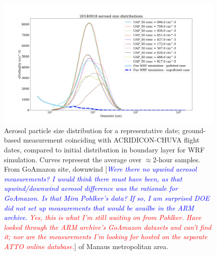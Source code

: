 \documentclass{article}
\newcommand{\drcomm}[1]{\textcolor{blue}{\textit{#1}}}
\newcommand{\klcomm}[1]{\textcolor{red}{\textit{#1}}}
\begin{document}
\clearpage
\newpage

\begin{figure}[ht]
    \centering
    \includegraphics[width=12cm]{goama/v6_aero_size_distb_20140918_figure.png}
    \caption{Aerosol particle size distribution for a representative date; ground-based measurement coinciding with ACRIDICON-CHUVA flight dates, compared to initial distribution in boundary layer for WRF simulation. Curves represent the average over $\approx$2-hour samples. From GoAmazon site, downwind [\drcomm{Were there no upwind aerosol measurements? I would think there must have been, as that upwind/downwind aerosol difference was the rationale for GoAmazon. Is that Mira Pohlker's data? If so, I am surprised DOE did not set up measurements that would be availbe in the ARM archive.} \klcomm{Yes, this is what I'm still waiting on from Pohlker. Have looked through the ARM archive's GoAmazon datasets and can't find it; nor are the measurements I'm looking for hosted on the separate ATTO online database.}] of Manaus metropolitan area.}
    \label{goaasd}
\end{figure}
\end{document}
